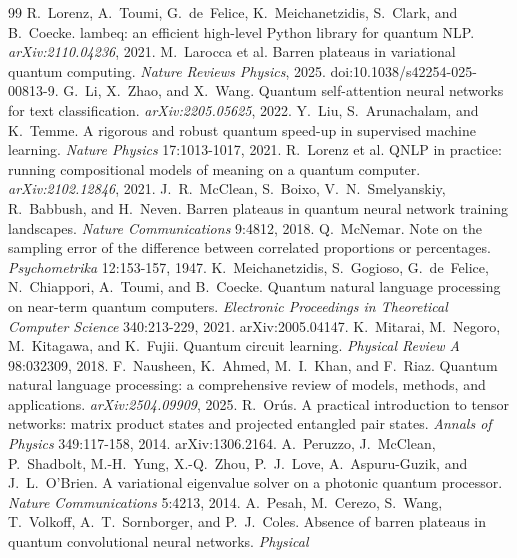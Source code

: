 \documentclass[10pt]{article}
\begin{document}
\begin{thebibliography}{99}
R.~Lorenz, A.~Toumi, G.~de~Felice, K.~Meichanetzidis, S.~Clark, and B.~Coecke. lambeq: an efficient
high-level Python library for quantum NLP. \emph{arXiv:2110.04236}, 2021.
 M.~Larocca et al. Barren plateaus in variational quantum
computing. \emph{Nature Reviews Physics}, 2025. doi:10.1038/s42254-025-00813-9.
 G.~Li, X.~Zhao, and X.~Wang. Quantum self-attention neural networks
for text classification. \emph{arXiv:2205.05625}, 2022.
 Y.~Liu, S.~Arunachalam, and K.~Temme. A rigorous and robust
quantum speed-up in supervised machine learning. \emph{Nature Physics} 17:1013-1017, 2021.
 R.~Lorenz et al. QNLP in practice: running compositional
models of meaning on a quantum computer. \emph{arXiv:2102.12846}, 2021.
 J.~R.~McClean, S.~Boixo, V.~N.~Smelyanskiy, R.~Babbush,
and H.~Neven. Barren plateaus in quantum neural network training landscapes. \emph{Nature
Communications} 9:4812, 2018.
 Q.~McNemar. Note on the sampling error of the difference between
correlated proportions or percentages. \emph{Psychometrika} 12:153-157, 1947.
 K.~Meichanetzidis, S.~Gogioso,
G.~de~Felice, N.~Chiappori, A.~Toumi, and B.~Coecke. Quantum natural language processing on
near-term quantum computers. \emph{Electronic Proceedings in Theoretical Computer Science}
340:213-229, 2021. arXiv:2005.04147.
 K.~Mitarai, M.~Negoro, M.~Kitagawa, and K.~Fujii.
Quantum circuit learning. \emph{Physical Review A} 98:032309, 2018.
 F.~Nausheen, K.~Ahmed, M.~I.~Khan, and F.~Riaz.
Quantum natural language processing: a comprehensive review of models, methods, and applications.
\emph{arXiv:2504.09909}, 2025.
 R.~Or\'us. A practical introduction to tensor networks: matrix
product states and projected entangled pair states. \emph{Annals of Physics} 349:117-158, 2014.
arXiv:1306.2164.
 A.~Peruzzo, J.~McClean, P.~Shadbolt, M.-H.~Yung,
X.-Q.~Zhou, P.~J.~Love, A.~Aspuru-Guzik, and J.~L.~O'Brien. A variational eigenvalue solver on a
photonic quantum processor. \emph{Nature Communications} 5:4213, 2014.
 A.~Pesah, M.~Cerezo, S.~Wang, T.~Volkoff, A.~T.~Sornborger,
and P.~J.~Coles. Absence of barren plateaus in quantum convolutional neural networks. \emph{Physical
}
\end{thebibliography}
\end{document}
